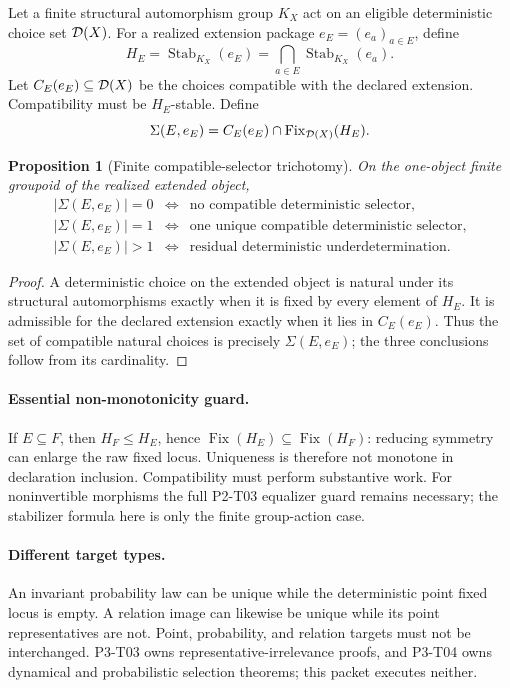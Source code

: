 \documentclass[11pt]{article}
\newcommand{\Fix}{\operatorname{Fix}}
\newcommand{\Stab}{\operatorname{Stab}}
\newtheorem{proposition}{Proposition}
\begin{document}
Let a finite structural automorphism group \(K_X\) act on an eligible
deterministic choice set \({\cal D}(X)\).  For a realized extension package
\(e_E=(e_a)_{a\in E}\), define
\[
 H_E=\Stab_{K_X}(e_E)
     =\bigcap_{a\in E}\Stab_{K_X}(e_a).
\]
Let \(C_E(e_E)\subseteq{\cal D}(X)\) be the choices compatible with the
declared extension.  Compatibility must be \(H_E\)-stable.  Define
\[
 \Sigma(E,e_E)=C_E(e_E)\cap\Fix_{{\cal D}(X)}(H_E).
\]

\begin{proposition}[Finite compatible-selector trichotomy]
On the one-object finite groupoid of the realized extended object,
\[
\begin{array}{rcl}
|\Sigma(E,e_E)|=0 &\Longleftrightarrow& \text{no compatible deterministic selector},\\
|\Sigma(E,e_E)|=1 &\Longleftrightarrow& \text{one unique compatible deterministic selector},\\
|\Sigma(E,e_E)|>1 &\Longleftrightarrow& \text{residual deterministic underdetermination}.
\end{array}
\]
\end{proposition}

\begin{proof}
A deterministic choice on the extended object is natural under its structural
automorphisms exactly when it is fixed by every element of \(H_E\).  It is
admissible for the declared extension exactly when it lies in \(C_E(e_E)\).
Thus the set of compatible natural choices is precisely \(\Sigma(E,e_E)\);
the three conclusions follow from its cardinality.
\end{proof}

\paragraph{Essential non-monotonicity guard.}
If \(E\subseteq F\), then \(H_F\leq H_E\), hence
\(\Fix(H_E)\subseteq\Fix(H_F)\): reducing symmetry can enlarge the raw fixed
locus.  Uniqueness is therefore not monotone in declaration inclusion.
Compatibility must perform substantive work.  For noninvertible morphisms the
full P2-T03 equalizer guard remains necessary; the stabilizer formula here is
only the finite group-action case.

\paragraph{Different target types.}
An invariant probability law can be unique while the deterministic point
fixed locus is empty.  A relation image can likewise be unique while its point
representatives are not.  Point, probability, and relation targets must not be
interchanged.  P3-T03 owns representative-irrelevance proofs, and P3-T04 owns
dynamical and probabilistic selection theorems; this packet executes neither.
\end{document}
